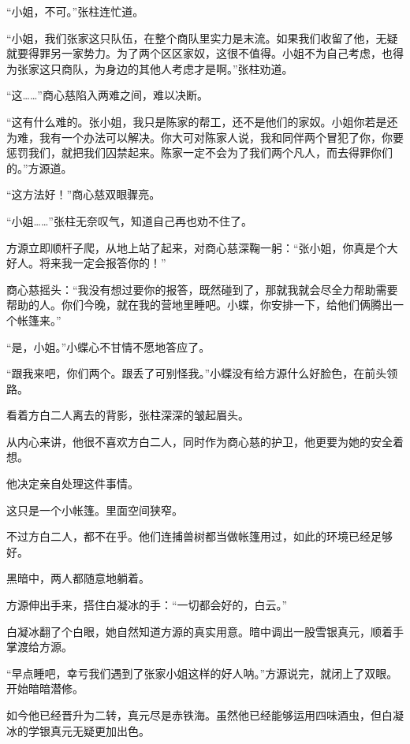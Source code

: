 
\begin{this_body}

“小姐，不可。”张柱连忙道。

“小姐，我们张家这只队伍，在整个商队里实力是末流。如果我们收留了他，无疑就要得罪另一家势力。为了两个区区家奴，这很不值得。小姐不为自己考虑，也得为张家这只商队，为身边的其他人考虑才是啊。”张柱劝道。

“这……”商心慈陷入两难之间，难以决断。

“这有什么难的。张小姐，我只是陈家的帮工，还不是他们的家奴。小姐你若是还为难，我有一个办法可以解决。你大可对陈家人说，我和同伴两个冒犯了你，你要惩罚我们，就把我们囚禁起来。陈家一定不会为了我们两个凡人，而去得罪你们的。”方源道。

“这方法好！”商心慈双眼骤亮。

“小姐……”张柱无奈叹气，知道自己再也劝不住了。

方源立即顺杆子爬，从地上站了起来，对商心慈深鞠一躬：“张小姐，你真是个大好人。将来我一定会报答你的！”

商心慈摇头：“我没有想过要你的报答，既然碰到了，那就我就会尽全力帮助需要帮助的人。你们今晚，就在我的营地里睡吧。小蝶，你安排一下，给他们俩腾出一个帐篷来。”

“是，小姐。”小蝶心不甘情不愿地答应了。

“跟我来吧，你们两个。跟丢了可别怪我。”小蝶没有给方源什么好脸色，在前头领路。

看着方白二人离去的背影，张柱深深的皱起眉头。

从内心来讲，他很不喜欢方白二人，同时作为商心慈的护卫，他更要为她的安全着想。

他决定亲自处理这件事情。

这只是一个小帐篷。里面空间狭窄。

不过方白二人，都不在乎。他们连捕兽树都当做帐篷用过，如此的环境已经足够好。

黑暗中，两人都随意地躺着。

方源伸出手来，搭住白凝冰的手：“一切都会好的，白云。”

白凝冰翻了个白眼，她自然知道方源的真实用意。暗中调出一股雪银真元，顺着手掌渡给方源。

“早点睡吧，幸亏我们遇到了张家小姐这样的好人呐。”方源说完，就闭上了双眼。开始暗暗潜修。

如今他已经晋升为二转，真元尽是赤铁海。虽然他已经能够运用四味酒虫，但白凝冰的学银真元无疑更加出色。


\end{this_body}
